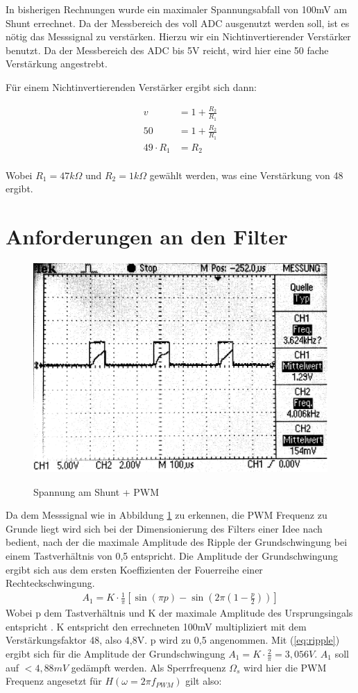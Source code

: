 In bisherigen Rechnungen wurde ein maximaler Spannungsabfall von 100mV am Shunt errechnet. Da der Messbereich des voll ADC ausgenutzt werden soll,
ist es nötig das Messsignal zu verstärken. Hierzu wir ein Nichtinvertierender Verstärker benutzt. Da der Messbereich des ADC bis 5V reicht, wird hier eine 
50 fache Verstärkung angestrebt.

Für einem Nichtinvertierenden Verstärker ergibt sich dann:

\begin{align*}
v &= 1 + \frac{R_2}{R_1}\\
50 &= 1 + \frac{R_2}{R_1}\\
49\cdot R_1 &= R_2
\end{align*}
\\
Wobei $R_1 = 47 k\Omega$ und $R_2 = 1 k\Omega$  gewählt werden, was eine Verstärkung von 48 ergibt.



\section{Anforderungen an den Filter}

\begin{figure}[H]
\centering
\includegraphics[width=.8\textwidth]{oszi.png}\\
\caption{Spannung am Shunt + PWM}%
\label{fig:pwm+i}
\end{figure}

Da dem Messsignal wie in Abbildung \ref{fig:pwm+i} zu erkennen, die PWM Frequenz zu Grunde liegt wird sich bei der Dimensionierung des Filters einer Idee nach \cite{Alter2008} bedient, nach der die maximale Amplitude des Ripple der Grundschwingung bei einem
Tastverhältnis von 0,5 entspricht. Die Amplitude der Grundschwingung ergibt sich aus dem ersten Koeffizienten der Fouerreihe einer Rechteckschwingung.
\begin{align}
A_1 = K\cdot \frac{1}{\pi}[\sin(\pi p)-\sin(2\pi(1-\frac{p}{2}))]
\label{eq:ripple}
\end{align}
Wobei p dem Tastverhältnis und K der maximale Amplitude des Ursprungsingals entspricht \cite{Alter2008}. K entspricht den errechneten 100mV multipliziert mit dem Verstärkungsfaktor 48, also 4,8V. p wird zu 0,5
angenommen. Mit (\ref{eq:ripple}) ergibt sich für die Amplitude der Grundschwingung $ A_1 = K\cdot \frac{2}{\pi} = 3,056V$. $A_1$ soll auf $ < 4,88mV$ gedämpft werden.
Als Sperrfrequenz $\Omega_s $ wird hier die PWM Frequenz angesetzt für $H(\omega=2\pi f_{PWM})$ gilt also:

